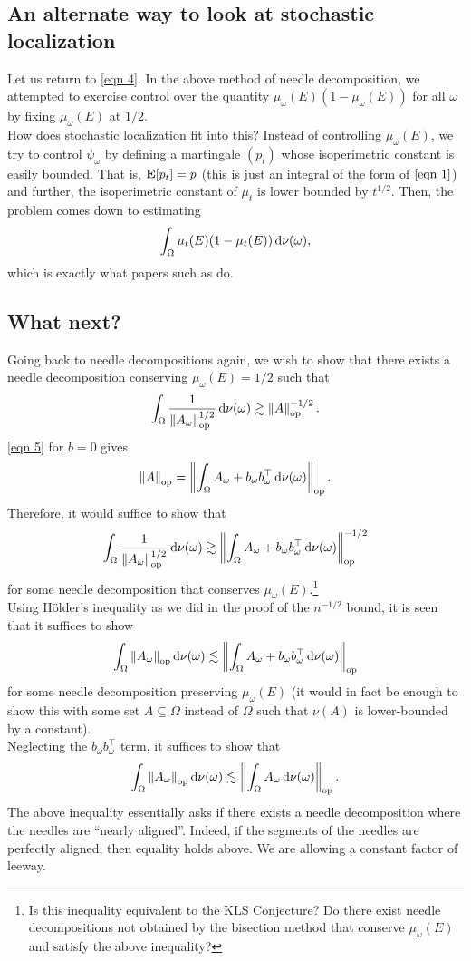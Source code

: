 \documentclass{article}
\begin{document}
\subsection{An alternate way to look at stochastic localization}

Let us return to \eqref{eqn 4}. In the above method of needle decomposition, we attempted to exercise control over the quantity $\mu_\omega(E) ( 1 - \mu_\omega(E) )$ for all $\omega$ by fixing $\mu_\omega(E)$ at $1/2$.\\

How does stochastic localization fit into this? Instead of controlling $\mu_\omega(E)$, we try to control $\psi_\omega$ by defining a martingale $(p_t)$ whose isoperimetric constant is easily bounded. That is, $\textbf{E}[p_t] = p$ (this is just an integral of the form of $\eqref{eqn 1}$) and further, the isoperimetric constant of $\mu_t$ is lower bounded by $t^{1/2}$. Then, the problem comes down to estimating
\[ \int_\Omega \mu_t(E) ( 1 - \mu_t(E) ) \operatorname{d}\!{\nu(\omega)}, \]
which is exactly what papers such as \cite{chen2021constant} do.

\subsection{What next?}

Going back to needle decompositions again, we wish to show that there exists a needle decomposition conserving $\mu_\omega(E) = 1/2$ such that
\[ \int_{\Omega} \frac{1}{\left\lVert A_\omega\right\rVert_{\text{op}}^{1/2}} \operatorname{d}\!{\nu(\omega)} \gtrsim \left\lVert A\right\rVert_{\text{op}}^{-1/2}. \]
\eqref{eqn 5} for $b = 0$ gives
\[ \left\lVert A\right\rVert_{\text{op}} = \left\lVert\int_{\Omega} A_\omega + b_\omega b_\omega^\top \operatorname{d}\!{\nu(\omega)} \right\rVert_{\text{op}}. \]
Therefore, it would suffice to show that
\[ \int_\Omega \frac{1}{\left\lVert A_\omega\right\rVert_{\text{op}}^{1/2}} \operatorname{d}\!{\nu(\omega)} \gtrsim \left\lVert\int_{\Omega} A_\omega + b_\omega b_\omega^\top \operatorname{d}\!{\nu(\omega)} \right\rVert_{\text{op}}^{-1/2} \]
for some needle decomposition that conserves $\mu_\omega(E)$.\footnote{Is this inequality equivalent to the KLS Conjecture? Do there exist needle decompositions not obtained by the bisection method that conserve $\mu_\omega(E)$ and satisfy the above inequality?}\\

Using H\"{o}lder's inequality as we did in the proof of the $n^{-1/2}$ bound, it is seen that it suffices to show
\[ \int_\Omega \left\lVert A_\omega\right\rVert_{\text{op}} \operatorname{d}\!{\nu(\omega)} \lesssim \left\lVert \int_\Omega A_\omega + b_\omega b_\omega^\top \operatorname{d}\!{\nu(\omega)} \right\rVert_{\text{op}} \]
for some needle decomposition preserving $\mu_\omega(E)$ (it would in fact be enough to show this with some set $A\subseteq \Omega$ instead of $\Omega$ such that $\nu(A)$ is lower-bounded by a constant).\\
Neglecting the $b_\omega b_\omega^\top$ term, it suffices to show that
\[ \int_\Omega \left\lVert A_\omega\right\rVert_{\text{op}} \operatorname{d}\!{\nu(\omega)} \lesssim \left\lVert \int_\Omega A_\omega \operatorname{d}\!{\nu(\omega)} \right\rVert_{\text{op}}. \]
The above inequality essentially asks if there exists a needle decomposition where the needles are ``nearly aligned''. Indeed, if the segments of the needles are perfectly aligned, then equality holds above. We are allowing a constant factor of leeway.



\end{document}
